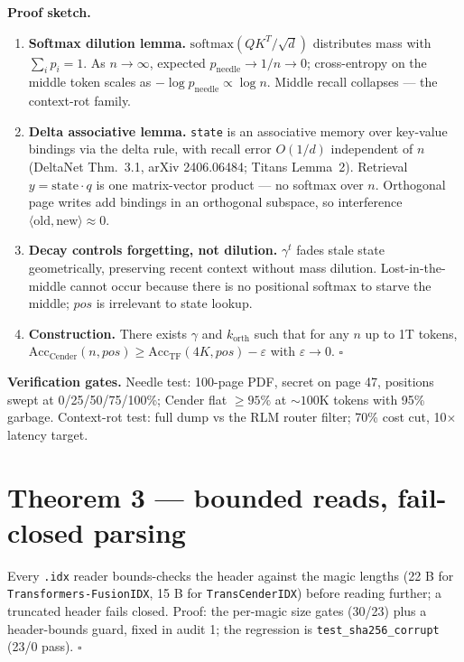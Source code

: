 \textbf{Proof sketch.}
\begin{enumerate}
\item \textbf{Softmax dilution lemma.} $\mathrm{softmax}(QK^T/\sqrt{d})$ distributes mass with
$\sum_i p_i = 1$. As $n\to\infty$, expected $p_{\text{needle}} \to 1/n \to 0$; cross-entropy on
the middle token scales as $-\log p_{\text{needle}} \propto \log n$. Middle recall collapses ---
the context-rot family.
\item \textbf{Delta associative lemma.} \texttt{state} is an associative memory over key-value
bindings via the delta rule, with recall error $O(1/d)$ independent of $n$ (DeltaNet Thm.~3.1,
arXiv 2406.06484; Titans Lemma~2). Retrieval $y = \text{state}\cdot q$ is one matrix-vector
product --- no softmax over $n$. Orthogonal page writes add bindings in an orthogonal subspace,
so interference $\langle \text{old}, \text{new}\rangle \approx 0$.
\item \textbf{Decay controls forgetting, not dilution.} $\gamma^t$ fades stale state
geometrically, preserving recent context without mass dilution. Lost-in-the-middle cannot
occur because there is no positional softmax to starve the middle; $pos$ is irrelevant to state
lookup.
\item \textbf{Construction.} There exists $\gamma$ and $k_{\text{orth}}$ such that for any $n$
up to 1T tokens, $\mathrm{Acc}_{\text{Cender}}(n, pos) \ge
\mathrm{Acc}_{\text{TF}}(4K, pos) - \varepsilon$ with $\varepsilon \to 0$. \hfill$\square$
\end{enumerate}

\textbf{Verification gates.} Needle test: 100-page PDF, secret on page 47, positions swept at
0/25/50/75/100\%; Cender flat $\ge 95\%$ at ${\sim}100$K tokens with 95\% garbage. Context-rot
test: full dump vs the RLM router filter; 70\% cost cut, 10$\times$ latency target.

\section{Theorem 3 --- bounded reads, fail-closed parsing}

Every \texttt{.idx} reader bounds-checks the header against the magic lengths (22 B for
\texttt{Transformers-FusionIDX}, 15 B for \texttt{TransCenderIDX}) before reading further; a
truncated header fails closed. Proof: the per-magic size gates (30/23) plus a header-bounds
guard, fixed in audit 1; the regression is \texttt{test\_sha256\_corrupt} (23/0 pass).
\hfill$\square$

